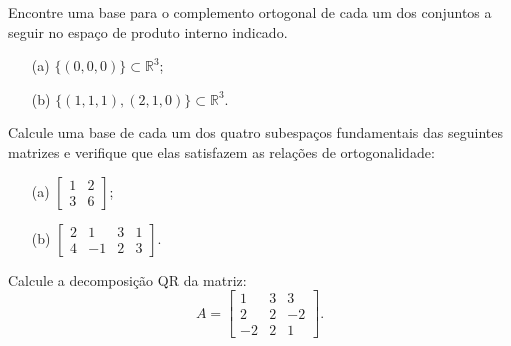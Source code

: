 \begin{question}
  Encontre uma base para o complemento ortogonal de cada um dos conjuntos a seguir no espaço de produto interno indicado.
  \begin{itemize}
    \item[(a)] $\{(0,0,0)\} \subset \mathbb{R}^3$;
    \item[(b)] $\{(1,1,1), (2,1,0)\} \subset \mathbb{R}^3$.
  \end{itemize}
\end{question}

\begin{resolution}

\end{resolution}

\begin{question}
  Calcule uma base de cada um dos quatro subespaços fundamentais das seguintes matrizes e verifique que elas satisfazem as relações de ortogonalidade:
  \begin{multicols}{2}
    \begin{itemize}
      \item[(a)] $\begin{bmatrix}
                1 & 2 \\
                3 & 6
              \end{bmatrix}$;
      \item[(b)] $\begin{bmatrix}
                2 & 1  & 3 & 1 \\
                4 & -1 & 2 & 3
              \end{bmatrix}$.
    \end{itemize}
  \end{multicols}
  \vspace{8pt}
\end{question}

\begin{resolution}

\end{resolution}

\begin{question}
  Calcule a decomposição QR da matriz:
  \[
    A = \begin{bmatrix}
      1  & 3 & 3  \\
      2  & 2 & -2 \\
      -2 & 2 & 1
    \end{bmatrix}.
  \]
\end{question}


